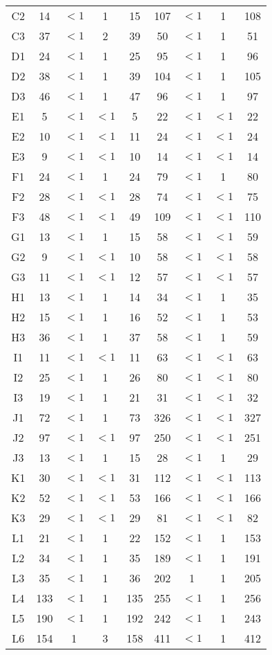\begin{center}
\begin{longtable}{ccccc|cccc}
C2&14&$<1$&1&15&107&$<1$&1&108\\
C3&37&$<1$&2&39&50&$<1$&1&51\\
D1&24&$<1$&1&25&95&$<1$&1&96\\
D2&38&$<1$&1&39&104&$<1$&1&105\\
D3&46&$<1$&1&47&96&$<1$&1&97\\
E1&5&$<1$&$<1$&5&22&$<1$&$<1$&22\\
E2&10&$<1$&$<1$&11&24&$<1$&$<1$&24\\
E3&9&$<1$&$<1$&10&14&$<1$&$<1$&14\\
F1&24&$<1$&1&24&79&$<1$&1&80\\
F2&28&$<1$&$<1$&28&74&$<1$&$<1$&75\\
F3&48&$<1$&$<1$&49&109&$<1$&$<1$&110\\
G1&13&$<1$&1&15&58&$<1$&$<1$&59\\
G2&9&$<1$&$<1$&10&58&$<1$&$<1$&58\\
G3&11&$<1$&$<1$&12&57&$<1$&$<1$&57\\
H1&13&$<1$&1&14&34&$<1$&1&35\\
H2&15&$<1$&1&16&52&$<1$&1&53\\
H3&36&$<1$&1&37&58&$<1$&1&59\\
I1&11&$<1$&$<1$&11&63&$<1$&$<1$&63\\
I2&25&$<1$&1&26&80&$<1$&$<1$&80\\
I3&19&$<1$&1&21&31&$<1$&$<1$&32\\
J1&72&$<1$&1&73&326&$<1$&$<1$&327\\
J2&97&$<1$&$<1$&97&250&$<1$&$<1$&251\\
J3&13&$<1$&1&15&28&$<1$&1&29\\
K1&30&$<1$&$<1$&31&112&$<1$&$<1$&113\\
K2&52&$<1$&$<1$&53&166&$<1$&$<1$&166\\
K3&29&$<1$&$<1$&29&81&$<1$&$<1$&82\\
L1&21&$<1$&1&22&152&$<1$&1&153\\
L2&34&$<1$&1&35&189&$<1$&1&191\\
L3&35&$<1$&1&36&202&1&1&205\\
L4&133&$<1$&1&135&255&$<1$&1&256\\
L5&190&$<1$&1&192&242&$<1$&1&243\\
L6&154&1&3&158&411&$<1$&1&412\\
\end{longtable}
\end{center}

